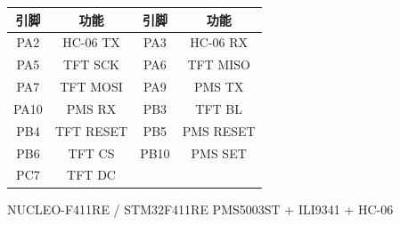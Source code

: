 \documentclass[12pt,a4paper]{ctexart}
\begin{document}
\begin{center}
\begin{tabular}{cccc}
\toprule
\textbf{引脚} & \textbf{功能} &
\textbf{引脚} & \textbf{功能} \\
\midrule
PA2  & HC-06 TX &
PA3  & HC-06 RX \\

PA5  & TFT SCK &
PA6  & TFT MISO \\

PA7  & TFT MOSI &
PA9  & PMS TX \\

PA10 & PMS RX &
PB3  & TFT BL \\

PB4  & TFT RESET &
PB5  & PMS RESET \\

PB6  & TFT CS &
PB10 & PMS SET \\

PC7  & TFT DC &
      &          \\
\bottomrule
\end{tabular}
\end{center}

\vfill

\begin{center}
\small
NUCLEO-F411RE / STM32F411RE \quad
PMS5003ST + ILI9341 + HC-06
\end{center}
\end{document}
